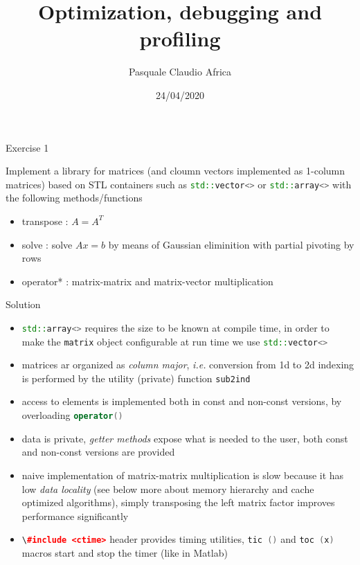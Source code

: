 \documentclass[10pt]{beamer}
\begin{document}
    \title{Optimization, debugging and profiling}
    \author{Pasquale Claudio Africa}
    \date{24/04/2020}

\begin{frame}
    \maketitle
\end{frame}

\begin{frame}{Exercise 1}

Implement a
library for matrices (and cloumn vectors 
implemented as 1-column matrices) based on 
STL containers such as \lstinline[language=C++]{std::vector<>}
or \lstinline[language=C++]{std::array<>}
with the following methods/functions
\begin{itemize}
\item transpose : $A = A^{T}$
\item solve : solve $A x = b$ by means of Gaussian eliminition with partial pivoting by rows
\item operator* : matrix-matrix and matrix-vector multiplication
\end{itemize}
\end{frame}

\begin{frame}[allowframebreaks]{Solution}
\begin{itemize}
\item \lstinline[language=C++]{std::array<>}
      requires the size to be known at compile time,
      in order to make the \lstinline[language=C++]{matrix}
      object configurable at run time we use 
      \lstinline[language=C++]{std::vector<>}\\[3mm]
\item matrices ar organized as \emph{column major}, {\it i.e.}
      conversion from 1d to 2d indexing is performed by the utility
      (private) function \lstinline[language=C++]{sub2ind}\\[3mm]
\item access to elements is implemented both in const and non-const
      versions, by overloading \lstinline[language=C++]{operator()} \\[3mm]
\item data is private, \emph{getter methods} expose what is needed to 
      the user, both const and non-const versions are provided \\[3mm]
\item naive implementation of matrix-matrix multiplication is slow 
      because it has low \emph{data locality}
      (see below more about memory hierarchy and cache optimized algorithms), 
      simply transposing the left matrix factor improves performance significantly\\[3mm]
\item \lstinline[language=C++]{\#include <ctime>} header provides timing utilities,
      \lstinline[language=C++]{tic ()} and \lstinline[language=C++]{toc (x)} macros
      start and stop the timer (like in Matlab)
\end{itemize}
\end{frame}
\end{document}
